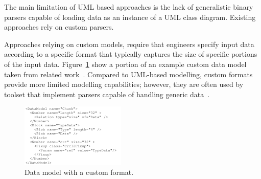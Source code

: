 The main limitation of UML based approaches is the lack of generalistic binary parsers capable of loading data as an instance of a UML class diagram. Existing approaches rely on custom parsers.

Approaches relying on custom models, require that engineers specify input data according to a specific format that typically captures the size of specific portions of the input data. Figure~\ref{fig:pit} show a portion of an example custom data model taken from related work~\cite{pham2016model}.
Compared to UML-based modelling, custom formats provide more limited modelling capabilities; however, they are often used by toolset that implement parsers capable of handling generic data~\cite{PeachFuzzer}.


\begin{figure}[t!]
  \centering
    \includegraphics[width=5cm]{images/PeachPit}
      \caption{Data model with a custom format.}
      \label{fig:pit}
\end{figure}
